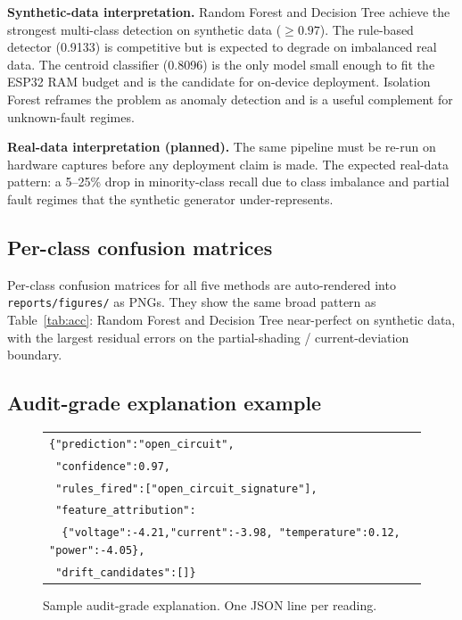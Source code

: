 \documentclass[12pt,journal,onecolumn]{IEEEtran}
\begin{document}
\textbf{Synthetic-data interpretation.}
Random Forest and Decision Tree achieve the strongest multi-class
detection on synthetic data ($\geq 0.97$). The rule-based detector
(0.9133) is competitive but is expected to degrade on imbalanced
real data. The centroid classifier (0.8096) is the only model
small enough to fit the ESP32 RAM budget and is the candidate for
on-device deployment. Isolation Forest reframes the problem as
anomaly detection and is a useful complement for unknown-fault
regimes.

\textbf{Real-data interpretation (planned).}
The same pipeline must be re-run on hardware captures before any
deployment claim is made. The expected real-data pattern: a 5--25\%
drop in minority-class recall due to class imbalance and partial
fault regimes that the synthetic generator under-represents.

\subsection{Per-class confusion matrices}

Per-class confusion matrices for all five methods are auto-rendered
into \texttt{reports/figures/} as PNGs. They show the same broad
pattern as Table~\ref{tab:acc}: Random Forest and Decision Tree
near-perfect on synthetic data, with the largest residual errors
on the partial-shading / current-deviation boundary.

\subsection{Audit-grade explanation example}

\begin{figure}[h]
\centering
\begin{tabular}{l}
\texttt{\{"prediction":"open\_circuit",} \\
\texttt{\ "confidence":0.97,} \\
\texttt{\ "rules\_fired":["open\_circuit\_signature"],} \\
\texttt{\ "feature\_attribution":} \\
\texttt{\ \ \{"voltage":-4.21,"current":-3.98, "temperature":0.12, "power":-4.05\},} \\
\texttt{\ "drift\_candidates":[]\}} \\
\end{tabular}
\caption{Sample audit-grade explanation. One JSON line per reading.}
\label{fig:audit}
\end{figure}
\end{document}
